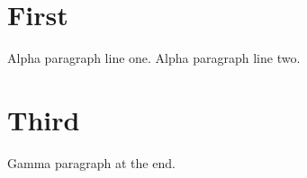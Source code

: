\documentclass{article}
\begin{document}
\section{First}
Alpha paragraph line one.
Alpha paragraph line two.



\section{Third}
Gamma paragraph at the end.
\end{document}
